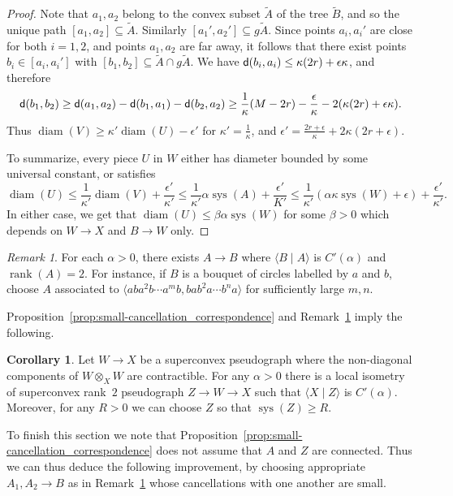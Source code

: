 \documentclass[12pt,oneside]{amsart}
\theoremstyle{definition}
\newtheorem{cor}[thm]{Corollary}
\theoremstyle{definition}
\theoremstyle{remark}
\newtheorem{rem}[thm]{Remark}
\newcommand{\dist}{\textup{\textsf{d}}}
\DeclareMathOperator{\diam}{\text{diam}}
\DeclareMathOperator{\rank}{rank}
\DeclareMathOperator{\sys}{\mathrm sys}
\begin{document}
\begin{proof}
Note that $a_1, a_2$ belong to the convex subset $\widetilde A$ of the tree $\widetilde B$, and so the unique path $[a_1, a_2]\subseteq \widetilde A$. Similarly $[a_1', a_2']\subseteq g\widetilde A$. Since points $a_i,a_i'$ are close for both $i=1,2$, and points $a_1,a_2$ are far away, it follows that there exist points $b_i\in [a_i, a_i']$ with $[b_1, b_2]\subseteq \widetilde A\cap g\widetilde A$. 
We have $\dist(b_i, a_i)\leq \kappa(2r)+\epsilon \kappa$, and therefore $$\dist(b_1, b_2) \geq \dist(a_1, a_2) - \dist(b_1, a_1)- \dist(b_2, a_2) \geq \frac{1}{\kappa}(M-2r)-\frac{\epsilon}{\kappa} - 2 (\kappa(2r)+\epsilon \kappa).$$
Thus $\diam(V)\geq \kappa'\diam(U) - \epsilon'$ for $\kappa' = \frac 1  \kappa$, and $\epsilon' = \frac{2r+\epsilon}{\kappa} + 2\kappa(2r+\epsilon)$.

To summarize, every piece $U$ in $W$ either has diameter bounded by some universal constant, or satisfies $$\diam(U)\leq \frac{1}{\kappa'} \diam(V) +\frac{\epsilon'}{\kappa'} \leq \frac{1}{\kappa'} \alpha\sys(A) +\frac{\epsilon'}{K'} \leq \frac{1}{\kappa'} (\alpha \kappa\sys(W)+\epsilon) +\frac{\epsilon'}{\kappa'}.$$ In either case, we get that $\diam(U)\leq \beta\alpha \sys(W)$ for some $\beta>0$ which depends on $W\to X$ and $B\to W$ only.
\end{proof}

\begin{rem}\label{rem: small cancellation in graphs}
    For each $\alpha>0$, there exists  $A\to B$ where $\langle B \mid A \rangle$ is $C'(\alpha)$ and $\rank(A)=2$. For instance, if $B$ is  a bouquet of circles labelled by $a$ and $b$,  choose $A$ associated to $\langle aba^2b \cdots a^mb, bab^2a\cdots b^na \rangle$ for  sufficiently large $m,n$.
\end{rem}


Proposition~\ref{prop:small-cancellation_correspondence} and Remark~\ref{rem: small cancellation in graphs} imply the following.
%
\begin{cor}\label{cor: small cancellation} Let $W\to X$ be a superconvex pseudograph where the non-diagonal components of $W \otimes_X W$ are contractible.
For any $\alpha>0$ there is a local isometry of superconvex rank~$2$ pseudograph $Z\to W \to X$ such that $\langle X\mid Z\rangle$ is $C'(\alpha)$. 
%
Moreover, for any $R>0$ we can choose $Z$ so that $\sys(Z)\geq R$.
\end{cor}

To finish this section we note that Proposition~\ref{prop:small-cancellation_correspondence} does not assume that $A$ and $Z$ are connected. Thus we can thus deduce the following improvement, by choosing appropriate $A_1, A_2\to B$ as in Remark~\ref{rem: small cancellation in graphs} whose cancellations with one another are small.
\end{document}
